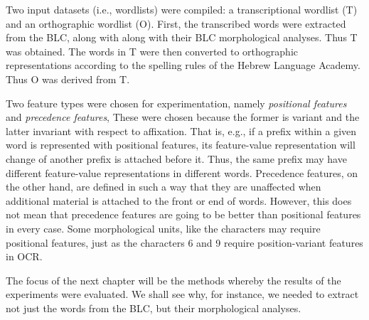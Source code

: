 Two input datasets (i.e., wordlists) were compiled: a 
transcriptional wordlist (T) and an orthographic wordlist (O).
 First, the transcribed words were extracted from the \ac{BLC}, along with along with their \ac{BLC} morphological analyses. Thus T was obtained.
The words in T were then converted to orthographic representations
according to the spelling rules of the Hebrew Language 
Academy. Thus O was derived from T. 

Two feature types were chosen for experimentation, namely \emph{positional features} and \emph{precedence features},
These were chosen because the former is variant and the latter invariant with respect to affixation. That is, e.g., if a prefix within a given word is represented with positional features, its feature-value representation will change of another prefix is attached before it. Thus, the same prefix may have different feature-value representations in different words. Precedence features, on the other hand, are defined in such a way that they are unaffected when additional material is attached to the front or end of words. However, this does not mean that precedence features are going to be better than positional features in every case. Some morphological units, like the characters may require positional features, just as the characters 6 and 9 require position-variant features in \ac{OCR}. 

The focus of the next chapter will be the methods whereby the results of the experiments were evaluated. We shall see why, for instance, we needed to extract not just the words from the \ac{BLC}, but their morphological analyses. 

